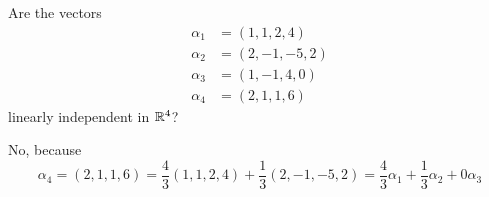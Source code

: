 \documentclass[a4paper, 10pt]{article}
\begin{document}
\begin{problem} 
Are the vectors
\begin{align*}
    \alpha_1 & = (1, 1, 2, 4)   \\
    \alpha_2 & = (2, -1, -5, 2) \\
    \alpha_3 & = (1, -1, 4, 0)  \\
    \alpha_4 & = (2, 1, 1, 6)
\end{align*}
linearly independent in \(\mathbb{R}^4\)?
\end{problem}
\begin{solution}
    No, because \[
        \alpha_4 = (2, 1, 1, 6) = \frac{4}{3} (1, 1, 2, 4) + \frac{1}{3} (2, -1, -5, 2) = \frac{4}{3} \alpha_1 + \frac{1}{3} \alpha_2 + 0\alpha_3
    \]
\end{solution}
\end{document}
